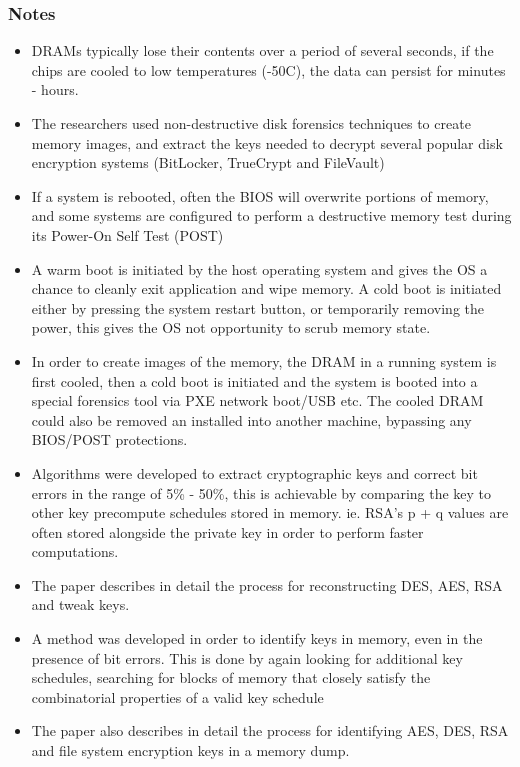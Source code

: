 \subsubsection{Notes}
\begin{itemize}
	\item DRAMs typically lose their contents over a period of several seconds, if the chips are cooled to low temperatures (-50\degree C), the data can persist for minutes - hours.
	\item The researchers used non-destructive disk forensics techniques to create memory images, and extract the keys needed to decrypt several popular disk encryption systems (BitLocker, TrueCrypt and FileVault)
	\item If a system is rebooted, often the BIOS will overwrite portions of memory, and some systems are configured to perform a destructive memory test during its Power-On Self Test (POST)
	\item A warm boot is initiated by the host operating system and gives the OS a chance to cleanly exit application and wipe memory.
	A cold boot is initiated either by pressing the system restart button, or temporarily removing the power, this gives the OS not opportunity to scrub memory state.
	\item In order to create images of the memory, the DRAM in a running system is first cooled, then a cold boot is initiated and the system is booted into a special forensics tool via PXE network boot/USB etc. The cooled DRAM could also be removed an installed into another machine, bypassing any BIOS/POST protections.
	\item Algorithms were developed to extract cryptographic keys and correct bit errors in the range of 5\% - 50\%, this is achievable by comparing the key to other key precompute schedules stored in memory. ie. RSA's p + q values are often stored alongside the private key in order to perform faster computations.
	\item The paper describes in detail the process for reconstructing DES, AES, RSA and tweak keys.
	\item A method was developed in order to identify keys in memory, even in the presence of bit errors. This is done by again looking for additional key schedules, searching for blocks of memory that closely satisfy the combinatorial properties of a valid key schedule
	\item The paper also describes in detail the process for identifying AES, DES, RSA and file system encryption keys in a memory dump.

\end{itemize}
